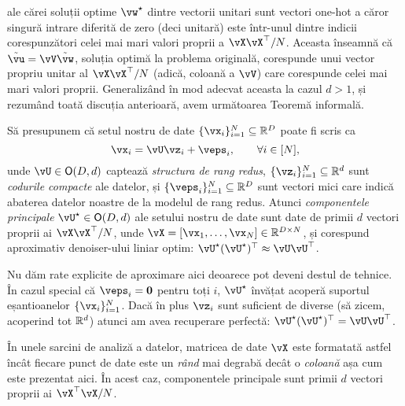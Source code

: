 \documentclass[../../book-main_ro.tex]{subfiles}
\begin{document}
ale cărei soluții optime \(\vw^{\star}\) dintre vectorii unitari sunt vectori one-hot a căror singură intrare diferită de zero (deci unitară) este într-unul dintre indicii corespunzători celei mai mari valori proprii a \(\vX\vX^{\top}/N\). Aceasta înseamnă că \(\tilde{\vu} = \vV\tilde{\vw}\), soluția optimă la problema originală, corespunde unui vector propriu unitar al \(\vX\vX^{\top}/N\) (adică, coloană a \(\vV\)) care corespunde celei mai mari valori proprii. Generalizând în mod adecvat aceasta la cazul \(d > 1\), și rezumând toată discuția anterioară, avem următoarea Teoremă informală.
\begin{theorem}\label{thm:pca}
    Să presupunem că setul nostru de date \(\{\vx_{i}\}_{i = 1}^{N} \subseteq \R^{D}\) poate fi scris ca 
    \begin{equation}
        \vx_{i} = \vU\vz_{i} + \veps_{i}, \qquad \forall i \in [N],
    \end{equation}
    unde \(\vU \in \O(D, d)\) captează \textit{structura de rang redus},
    \(\{\vz_{i}\}_{i = 1}^{N} \subseteq \R^{d}\) sunt \textit{codurile compacte}
    ale datelor, și \(\{\veps_{i}\}_{i = 1}^{N} \subseteq \R^{D}\) sunt vectori
    mici care indică abaterea datelor noastre de la modelul de rang redus. Atunci
    \textit{componentele principale} \(\vU^{\star} \in \O(D, d)\) ale setului
    nostru de date sunt date de primii \(d\) vectori proprii ai \(\vX\vX^{\top}/N\),
    unde \(\vX = [\vx_{1}, \dots, \vx_{N}] \in \R^{D \times N}\), și
    corespund aproximativ denoiser-ului liniar optim:
    \(\vU^{\star}(\vU^{\star})^{\top} \approx \vU\vU^{\top}\).
\end{theorem}
Nu dăm rate explicite de aproximare aici deoarece pot deveni destul de
tehnice. În cazul special că \(\veps_{i} = \vzero\) pentru toți \(i\),
\(\vU^{\star}\) învățat acoperă suportul eșantioanelor \(\{\vx_{i}\}_{i
= 1}^{N}\). Dacă în plus \(\vz_{i}\) sunt suficient de diverse (să zicem,
acoperind tot \(\mathbb{R}^{d}\)) atunci am avea recuperare perfectă:
\(\vU^{\star}(\vU^{\star})^{\top} = \vU\vU^{\top}\).

\begin{remark}
    În unele sarcini de analiză a datelor, matricea de date \(\vX\) este formatată astfel încât fiecare punct de date este un \textit{rând} mai degrabă decât o \textit{coloană} așa cum este prezentat aici. În acest caz, componentele principale sunt primii \(d\) vectori proprii ai \(\vX^{\top}\vX/N\).
\end{remark}
\end{document}
